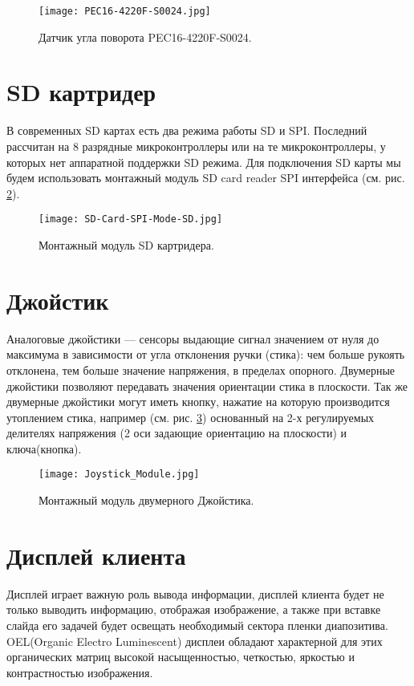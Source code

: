\begin{figure}[ht]
	\centering
     \texttt{[image: PEC16-4220F-S0024.jpg]}
	\caption
	{
	Датчик угла поворота PEC16-4220F-S0024.
	}
	\label{fig:PEC16-4220F-S0024}
\end{figure}

\section{SD картридер}
В современных SD картах есть два режима работы SD и SPI. Последний рассчитан на 8 разрядные микроконтроллеры или  на те микроконтроллеры, у которых нет аппаратной поддержки SD режима. Для подключения SD карты мы будем использовать монтажный модуль SD card reader SPI интерфейса (см. рис. \ref{fig:SDCardF}).
\begin{figure}[ht]
	\centering
     \texttt{[image: SD-Card-SPI-Mode-SD.jpg]}
	\caption
	{
	Монтажный модуль SD картридера.
	}
	\label{fig:SDCardF}
\end{figure}

\section{Джойстик}
Аналоговые джойстики — сенсоры выдающие сигнал значением от нуля до максимума в зависимости от угла отклонения ручки (стика): чем больше рукоять отклонена, тем больше значение напряжения, в пределах опорного. Двумерные джойстики позволяют передавать значения ориентации стика в плоскости. Так же двумерные джойстики могут иметь кнопку, нажатие на которую производится утоплением стика, например (см. рис. \ref{fig:JoystickModuleF}) основанный на 2-х регулируемых делителях напряжения (2 оси задающие ориентацию на плоскости) и ключа(кнопка).
\begin{figure}[ht]
	\centering
     \texttt{[image: Joystick\_Module.jpg]}
	\caption
	{
	Монтажный модуль двумерного Джойстика.
	}
	\label{fig:JoystickModuleF}
\end{figure}

\section{Дисплей клиента}
Дисплей играет важную роль вывода информации, дисплей клиента будет не только выводить информацию, отображая изображение, а также при вставке слайда его задачей будет освещать необходимый сектора пленки диапозитива. OEL(Organic Electro Luminescent) дисплеи обладают характерной для этих органических матриц высокой насыщенностью, четкостью, яркостью и контрастностью изображения.

